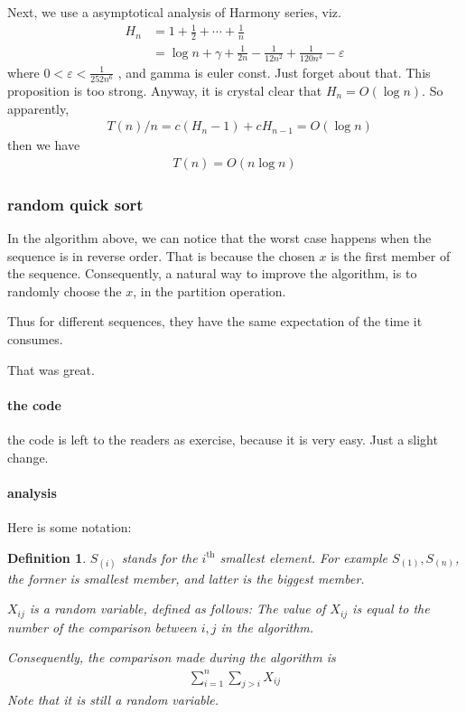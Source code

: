 \documentclass[a4paper, 10pt]{ctexart} %
\newtheorem{definition}{Definition}
\begin{document}
Next, we use a asymptotical analysis of Harmony series, viz.
\begin{align*}
    H_{n} & = 1 + \frac{1}{2} + \cdots + \frac{1}{n} \\
    & = \log n + \gamma + \frac{1}{2n}  -\frac{1}{12n ^{2} } + \frac{1}{120 n^{4} } - \varepsilon
\end{align*}
where $ 0 < \varepsilon < \frac{1}{252n ^{6} } $ , and gamma is euler const. Just forget about that. This proposition is too strong. Anyway, it is crystal clear that $H_{n} =  O \left(\log n\right)$. So apparently, 
\begin{align*}
    & T\left(n\right) / n  = c \left(H _{n} - 1\right)  + c H_{n-1}  = O\left(\log n\right)
\end{align*}
then we have 
\begin{align*}
T(n) = O\left(n \log n\right)
\end{align*}

\subsubsection{random quick sort}
In the algorithm above, we can notice that the worst case happens when the sequence 
is in reverse order. That is because the chosen $x$ is the first member of the sequence. 
Consequently, a natural way to improve the algorithm, is to randomly choose the $x$, in the
partition operation.

Thus for different sequences, they have the same expectation of the time it consumes.

That was great. 

\paragraph{the code} %
\label{par:the code}

the code is left to the readers as exercise, because it is 
very easy. Just a slight change.

\paragraph{analysis} %
\label{par:analysis}

Here is some notation: 
\begin{definition}
    $S_{\left(i\right)}$ stands for the $i^{\text{th}}$ smallest element. For example $S_{\left(1\right)}, S_{\left(n\right)}$, the former is smallest member, and latter is the biggest member. 

    $X_{ij}$ is a random variable, defined as follows: 
    The value of $X_{ij}$   
    is equal to the number of the comparison between $i , j$ 
    in the algorithm. 

    Consequently, the comparison made during the algorithm is 
    \begin{align*}
        \sum_{i  =1}  ^{n} \sum_{j > i}  X_{ij}
    \end{align*}
    Note that it is still a random variable.
\end{definition}
\end{document}
